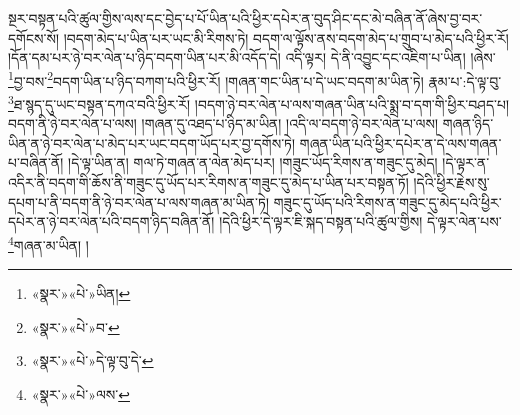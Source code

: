 སྔར་བསྟན་པའི་ཚུལ་གྱིས་ལས་དང་བྱེད་པ་པོ་ཡིན་པའི་ཕྱིར་དཔེར་ན་བུད་ཤིང་དང་མེ་བཞིན་ནོ་ཞེས་བྱ་བར་དགོངས་སོ། །བདག་མེད་པ་ཡིན་པར་ཡང་མི་རིགས་ཏེ། བདག་ལ་ལྟོས་ནས་བདག་མེད་པ་གྲུབ་པ་མེད་པའི་ཕྱིར་རོ། །དོན་དམ་པར་ཉེ་བར་ལེན་པ་ཉིད་བདག་ཡིན་པར་མི་འདོད་དེ། འདི་ལྟར། དེ་ནི་འབྱུང་དང་འཇིག་པ་ཡིན། །ཞེས་\footnote{«སྣར་»«པེ་»ཡིན། }བྱ་བས་\footnote{«སྣར་»«པེ་»བ་}བདག་ཡིན་པ་ཉིད་བཀག་པའི་ཕྱིར་རོ། །གཞན་གང་ཡིན་པ་དེ་ཡང་བདག་མ་ཡིན་ཏེ། རྣམ་པ་:དེ་ལྟ་བུ་\footnote{«སྣར་»«པེ་»དེ་ལྟ་བུ་དེ་}ཐ་སྙད་དུ་ཡང་བསྟན་དཀའ་བའི་ཕྱིར་རོ། །བདག་ཉེ་བར་ལེན་པ་ལས་གཞན་ཡིན་པའི་སྨྲ་བ་དག་གི་ཕྱིར་བཤད་པ། བདག་ནི་ཉེ་བར་ལེན་པ་ལས། །གཞན་དུ་འཐད་པ་ཉིད་མ་ཡིན། །འདི་ལ་བདག་ཉེ་བར་ལེན་པ་ལས། གཞན་ཉིད་ཡིན་ན་ཉེ་བར་ལེན་པ་མེད་པར་ཡང་བདག་ཡོད་པར་བྱ་དགོས་ཏེ། གཞན་ཡིན་པའི་ཕྱིར་དཔེར་ན་དེ་ལས་གཞན་པ་བཞིན་ནོ། །དེ་ལྟ་ཡིན་ན། གལ་ཏེ་གཞན་ན་ལེན་མེད་པར། །གཟུང་ཡོད་རིགས་ན་གཟུང་དུ་མེད། །དེ་ལྟར་ན་འདིར་ནི་བདག་གི་ཆོས་ནི་གཟུང་དུ་ཡོད་པར་རིགས་ན་གཟུང་དུ་མེད་པ་ཡིན་པར་བསྟན་ཏོ། །དེའི་ཕྱིར་རྗེས་སུ་དཔག་པ་ནི་བདག་ནི་ཉེ་བར་ལེན་པ་ལས་གཞན་མ་ཡིན་ཏེ། གཟུང་དུ་ཡོད་པའི་རིགས་ན་གཟུང་དུ་མེད་པའི་ཕྱིར་དཔེར་ན་ཉེ་བར་ལེན་པའི་བདག་ཉིད་བཞིན་ནོ། །དེའི་ཕྱིར་དེ་ལྟར་ཇི་སྐད་བསྟན་པའི་ཚུལ་གྱིས། དེ་ལྟར་ལེན་པས་\footnote{«སྣར་»«པེ་»ལས་}གཞན་མ་ཡིན། །
